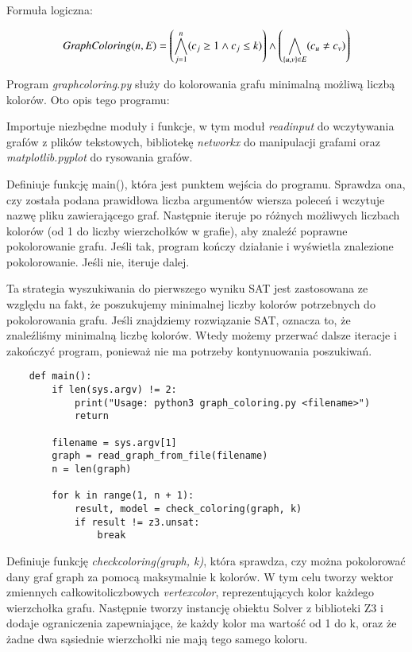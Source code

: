 Formuła logiczna:

\begin{align*}
	{\mathit{GraphColoring}}(n, E) = \left( \bigwedge_{j=1}^{n} (c_j \geq 1 \land c_j \leq k) \right) \land 
	\left( \bigwedge_{\{u, v\} \in E} (c_u \neq c_v) \right)
\end{align*}

Program \textit{graph\textunderscore coloring.py} służy do kolorowania grafu minimalną możliwą liczbą kolorów. Oto opis tego programu:

Importuje niezbędne moduły i funkcje, w tym moduł \textit{read\textunderscore input} do wczytywania grafów z plików tekstowych, bibliotekę \textit{networkx} do manipulacji grafami oraz \textit{matplotlib.pyplot} do rysowania grafów.

Definiuje funkcję main(), która jest punktem wejścia do programu. Sprawdza ona, czy została podana prawidłowa liczba argumentów wiersza poleceń i wczytuje nazwę pliku zawierającego graf. Następnie iteruje po różnych możliwych liczbach kolorów (od 1 do liczby wierzchołków w grafie), aby znaleźć poprawne pokolorowanie grafu. Jeśli tak, program kończy działanie i wyświetla znalezione pokolorowanie. Jeśli nie, iteruje dalej.

Ta strategia wyszukiwania do pierwszego wyniku SAT jest zastosowana ze względu na fakt, że poszukujemy minimalnej liczby kolorów potrzebnych do pokolorowania grafu. Jeśli znajdziemy rozwiązanie SAT, oznacza to, że znaleźliśmy minimalną liczbę kolorów. Wtedy możemy przerwać dalsze iteracje i zakończyć program, ponieważ nie ma potrzeby kontynuowania poszukiwań.

\begin{lstlisting}
	def main():
		if len(sys.argv) != 2:
			print("Usage: python3 graph_coloring.py <filename>")
			return
		
		filename = sys.argv[1]
		graph = read_graph_from_file(filename)
		n = len(graph)
		
		for k in range(1, n + 1):
			result, model = check_coloring(graph, k)
			if result != z3.unsat:
				break
\end{lstlisting}

Definiuje funkcję \textit{check\textunderscore coloring(graph, k)}, która sprawdza, czy można pokolorować dany graf graph za pomocą maksymalnie k kolorów. W tym celu tworzy wektor zmiennych całkowitoliczbowych \textit{vertex\textunderscore color}, reprezentujących kolor każdego wierzchołka grafu. Następnie tworzy instancję obiektu Solver z biblioteki Z3 i dodaje ograniczenia zapewniające, że każdy kolor ma wartość od 1 do k, oraz że żadne dwa sąsiednie wierzchołki nie mają tego samego koloru.

